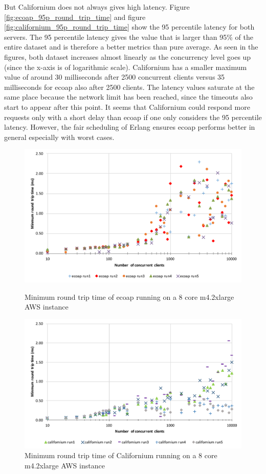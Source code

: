 But Californium does not always gives high latency. Figure \ref{fig:ecoap_95p_round_trip_time} and figure \ref{fig:californium_95p_round_trip_time} show the 95 percentile latency for both servers. The 95 percentile latency gives the value that is larger than 95\% of the entire dataset and is therefore a better metrics than pure average. As seen in the figures, both dataset increases almost linearly as the concurrency level goes up (since the x-axis is of logarithmic scale). Californium has a smaller maximum value of around 30 milliseconds after 2500 concurrent clients versus 35 milliseconds for ecoap also after 2500 clients. The latency values saturate at the same place because the network limit has been reached, since the timeouts also start to appear after this point. It seems that Californium could respond more requests only with a short delay than ecoap if one only considers the 95 percentile latency. However, the fair scheduling of Erlang ensures ecoap performs better in general especially with worst cases.

\begin{figure}[!htbp]
\centering
\includegraphics[scale = 0.8]{ecoap_min_round_trip_time}
\caption{Minimum round trip time of ecoap running on a 8 core m4.2xlarge AWS instance}
\label{fig:ecoap_min_round_trip_time}
\includegraphics[scale = 0.8]{californium_min_round_trip_time}
\caption{Minimum round trip time of Californium running on a 8 core m4.2xlarge AWS instance}
\label{fig:californium_min_round_trip_time}
\end{figure}

